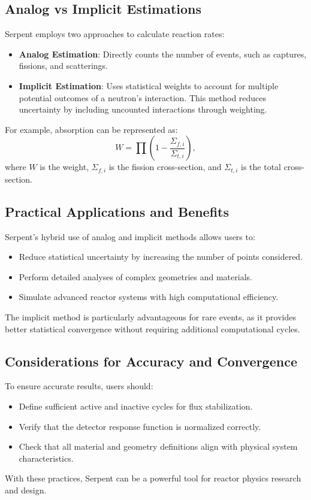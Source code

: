 \subsection{Analog vs Implicit Estimations}

Serpent employs two approaches to calculate reaction rates:
\begin{itemize}
    \item \textbf{Analog Estimation}: Directly counts the number of events, such as captures, fissions, and scatterings.
    \item \textbf{Implicit Estimation}: Uses statistical weights to account for multiple potential outcomes of a neutron’s interaction. This method reduces uncertainty by including uncounted interactions through weighting.
\end{itemize}

For example, absorption can be represented as:
\[
W = \prod \left(1 - \frac{\Sigma_{f,i}}{\Sigma_{t,i}}\right),
\]
where $W$ is the weight, $\Sigma_{f,i}$ is the fission cross-section, and $\Sigma_{t,i}$ is the total cross-section.

\subsection{Practical Applications and Benefits}

Serpent's hybrid use of analog and implicit methods allows users to:
\begin{itemize}
    \item Reduce statistical uncertainty by increasing the number of points considered.
    \item Perform detailed analyses of complex geometries and materials.
    \item Simulate advanced reactor systems with high computational efficiency.
\end{itemize}
The implicit method is particularly advantageous for rare events, as it provides better statistical convergence without requiring additional computational cycles.

\subsection{Considerations for Accuracy and Convergence}

To ensure accurate results, users should:
\begin{itemize}
    \item Define sufficient active and inactive cycles for flux stabilization.
    \item Verify that the detector response function is normalized correctly.
    \item Check that all material and geometry definitions align with physical system characteristics.
\end{itemize}
With these practices, Serpent can be a powerful tool for reactor physics research and design.
